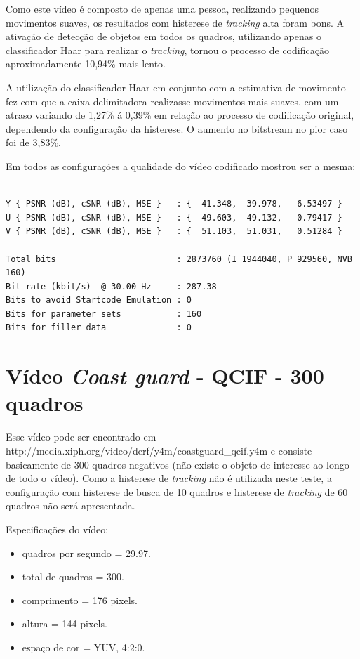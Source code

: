 Como este vídeo é composto de apenas uma pessoa, realizando pequenos movimentos suaves, os resultados com histerese de \textit{tracking} alta foram bons. A ativação de detecção de objetos em todos os quadros, utilizando apenas o classificador Haar para realizar o \textit{tracking}, tornou o processo de codificação aproximadamente 10,94\% mais lento. 

A utilização do classificador Haar em conjunto com a estimativa de movimento fez com que a caixa delimitadora realizasse movimentos mais suaves, com um atraso variando de 1,27\% á 0,39\% em relação ao processo de codificação original, dependendo da configuração da histerese. O aumento no bitstream no pior caso foi de 3,83\%.

Em todos as configurações a qualidade do vídeo codificado mostrou ser a mesma:

\begin{lstlisting}

Y { PSNR (dB), cSNR (dB), MSE }   : {  41.348,  39.978,   6.53497 }
U { PSNR (dB), cSNR (dB), MSE }   : {  49.603,  49.132,   0.79417 }
V { PSNR (dB), cSNR (dB), MSE }   : {  51.103,  51.031,   0.51284 }

Total bits                        : 2873760 (I 1944040, P 929560, NVB 160) 
Bit rate (kbit/s)  @ 30.00 Hz     : 287.38
Bits to avoid Startcode Emulation : 0 
Bits for parameter sets           : 160 
Bits for filler data              : 0

\end{lstlisting}


\section{ Vídeo \textit{Coast guard} - QCIF - 300 quadros }


Esse vídeo pode ser encontrado em http://media.xiph.org/video/derf/y4m/coastguard\_qcif.y4m e consiste basicamente de 300 quadros negativos (não existe o objeto de interesse ao longo de todo o vídeo). Como a histerese de \textit{tracking} não é utilizada neste teste, a configuração com histerese de busca de 10 quadros e histerese de \textit{tracking} de 60 quadros não será apresentada.


Especificações do vídeo:

\begin{itemize}
        \item quadros por segundo = 29.97.
        \item total de quadros    = 300.
        \item comprimento         = 176 pixels.
        \item altura              = 144 pixels. 
        \item espaço de cor       = YUV, 4:2:0.
\end{itemize}


